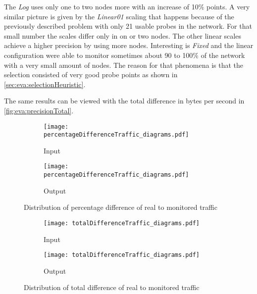 \documentclass[thesis.tex]{subfiles}
\begin{document}
The \textit{Log} uses only one to two nodes more with an increase of 10\% points. A very similar picture is given by the \textit{Linear01} scaling that happens because of the previously described problem with only 21 usable probes in the network. For that small number the scales differ only in on or two nodes. The other linear scales achieve a higher precision by using more nodes. Interesting is \textit{Fixed} and the linear configuration were able to monitor sometimes about 90 to 100\% of the network with a very small amount of nodes. The reason for that phenomena is that the selection consisted of very good probe points as shown in \autoref{sec:eva:selectionHeuristic}.

The same results can be viewed with the total difference in bytes per second in \autoref{fig:eva:precisionTotal}.

\begin{figure}[h]
	\centering
	\begin{subfigure}{.8\linewidth}
		\centering
		\texttt{[image: percentageDifferenceTraffic\_diagrams.pdf]}
		\caption{Input}
		\label{fig:eva:precisionPercent:input}
	\end{subfigure}
	\hfil
	\begin{subfigure}{0.8\linewidth}
		\centering
		\texttt{[image: percentageDifferenceTraffic\_diagrams.pdf]}
		\caption{Output}
		\label{fig:eva:precisionPercent:output}
	\end{subfigure}
	\caption{Distribution of percentage difference of real to monitored traffic}
	\label{fig:eva:precisionPercent}
\end{figure}

\begin{figure}[h]
	\centering
	\begin{subfigure}{.8\linewidth}
		\centering
		\texttt{[image: totalDifferenceTraffic\_diagrams.pdf]}
		\caption{Input}
		\label{fig:eva:precisionTotal:input}
	\end{subfigure}
	\begin{subfigure}{0.8\linewidth}
		\centering
		\texttt{[image: totalDifferenceTraffic\_diagrams.pdf]}
		\caption{Output}
		\label{fig:eva:precisionTotal:output}
	\end{subfigure}
	\caption{Distribution of total difference of real to monitored traffic}
	\label{fig:eva:precisionTotal}
\end{figure}
\end{document}
